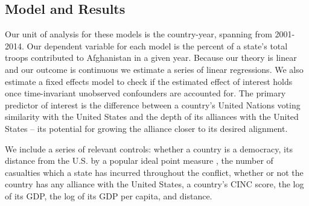 \documentclass[12pt,letterpaper]{article}
\begin{document}
		
	\subsection{Model and Results}
		Our unit of analysis for these models is the country-year, spanning from 2001-2014. Our dependent variable for each model is the percent of a state's total troops contributed to Afghanistan in a given year. Because our theory is linear and our outcome is continuous we estimate a series of linear regressions. We also estimate a fixed effects model to check if the estimated effect of interest holds once time-invariant unobserved confounders are accounted for. The primary predictor of interest is the difference between a country's United Nations voting similarity with the United States and the depth of its alliances with the United States -- its potential for growing the alliance closer to its desired alignment.
		
		We include a series of relevant controls: whether a country is a democracy, its distance from the U.S. by a popular ideal point measure \citep{bailey_estimatingdynamicstate_2017}, the number of casualties which a state has incurred throughout the conflict, whether or not the country has any alliance with the United States, a country's CINC score, the log of its GDP, the log of its GDP per capita, and distance. 
		
\end{document}
